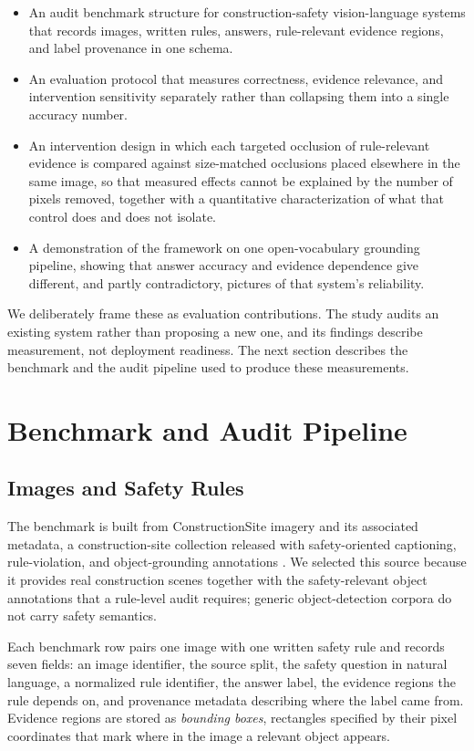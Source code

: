 \documentclass[conference]{IEEEtran}
\begin{document}
\begin{itemize}
\item An audit benchmark structure for construction-safety vision-language systems that records images, written rules, answers, rule-relevant evidence regions, and label provenance in one schema.
\item An evaluation protocol that measures correctness, evidence relevance, and intervention sensitivity separately rather than collapsing them into a single accuracy number.
\item An intervention design in which each targeted occlusion of rule-relevant evidence is compared against size-matched occlusions placed elsewhere in the same image, so that measured effects cannot be explained by the number of pixels removed, together with a quantitative characterization of what that control does and does not isolate.
\item A demonstration of the framework on one open-vocabulary grounding pipeline, showing that answer accuracy and evidence dependence give different, and partly contradictory, pictures of that system's reliability.
\end{itemize}

We deliberately frame these as evaluation contributions. The study audits an existing system rather than proposing a new one, and its findings describe measurement, not deployment readiness. The next section describes the benchmark and the audit pipeline used to produce these measurements.

\section{Benchmark and Audit Pipeline}

\subsection{Images and Safety Rules}

The benchmark is built from ConstructionSite imagery and its associated metadata, a construction-site collection released with safety-oriented captioning, rule-violation, and object-grounding annotations \cite{chen2025}. We selected this source because it provides real construction scenes together with the safety-relevant object annotations that a rule-level audit requires; generic object-detection corpora do not carry safety semantics.

Each benchmark row pairs one image with one written safety rule and records seven fields: an image identifier, the source split, the safety question in natural language, a normalized rule identifier, the answer label, the evidence regions the rule depends on, and provenance metadata describing where the label came from. Evidence regions are stored as \textit{bounding boxes}, rectangles specified by their pixel coordinates that mark where in the image a relevant object appears.
\end{document}

